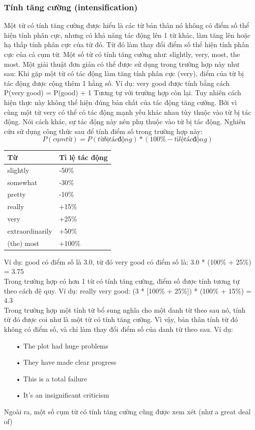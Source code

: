 \subsubsection*{Tính tăng cường (intensification)}
Một từ có tính tăng cường được hiểu là các từ bản thân nó không có điểm số thể hiện tính phân cực, nhưng có khả năng tác động lên 1 từ khác, làm tăng lên hoặc hạ thấp tính phân cực của từ đó. Từ đó làm thay đổi điểm số thể hiện tính phân cực của cả cụm từ. Một số từ có tính tăng cường như: slightly, very, most, the most. Một giải thuật đơn giản có thể được sử dụng trong trường hợp này như sau:
Khi gặp một từ có tác động làm tăng tính phân cực (very), điểm của từ bị tác động được cộng thêm 1 hằng số. 
Ví dụ: very good được tính bằng cách P(very good) = P(good) + 1
Tương tự với trường hợp còn lại. Tuy nhiên cách hiện thực này không thể hiện đúng bản chất của tác động tăng cường. Bởi vì cùng một từ very có thể có tác động mạnh yếu khác nhau tùy thuộc vào từ bị tác động. Nói cách khác, sự tác động này nên phụ thuộc vào từ bị tác động. Nghiên cứu \cite{taboada2011lexicon} sử dụng công thức sau để tính điểm số trong trường hợp này:
\begin{equation}
P (cụm từ) = P (từ bị tác động) * (100\% - tỉ lệ tác động)
\end{equation}
\begin{table}[h]
\begin{tabular}{l l}
\hline
\textbf{Từ} & \textbf{Tỉ lệ tác động} 
\\ \hline
slightly & -50\%
\\ 
somewhat & -30\%
\\ 
pretty & -10\%
\\ 
really & +15\%
\\ 
very & +25\%
\\ 
extraordinarily & +50\%
\\
(the) most & +100\%
\\ \hline
\end{tabular}
\end{table}
Ví dụ:
good có điểm số là 3.0, từ đó very good có điểm số là: 3.0 * (100\% + 25\%) =  3.75\\
Trong trường hợp có hơn 1 từ có tính tăng cường, điểm số được tính tương tự theo cách đệ quy. Ví dụ: really very good: (3 * [100\% + 25\%]) * (100\% + 15\%) = 4.3\\

Trong trường hợp một tính từ bổ sung nghĩa cho một danh từ theo sau nó, tính từ đó được coi như là một từ có tính tăng cường. Vì vậy, bản thân tính từ đó không có điểm số, và chỉ làm thay đổi điểm số của danh từ theo sau. 
Ví dụ:
\begin{itemize}
\item[•] The plot had huge problems
\item[•] They have made clear progress
\item[•] This is a total failure
\item[•] It’s an insignificant criticism
\end{itemize}
Ngoài ra, một số cụm từ có tính tăng cường cũng được xem xét (như a great deal of)
